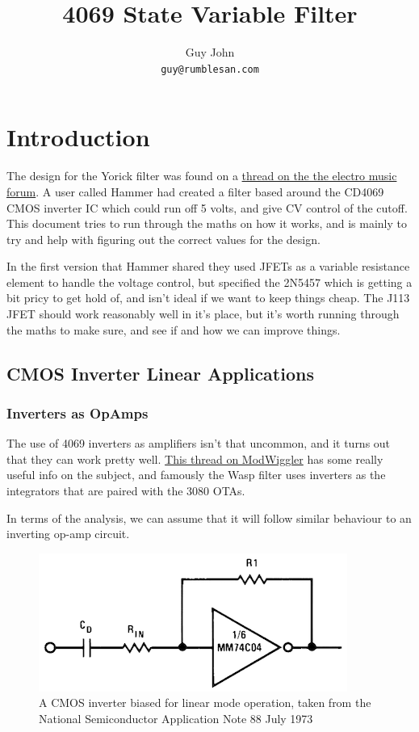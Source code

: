 \documentclass{article}
\title{4069 State Variable Filter}
\author{Guy John \\ \texttt{guy@rumblesan.com}}
\begin{document}
\maketitle

\section{Introduction}
The design for the Yorick filter was found on a \href{https://electro-music.com/forum/topic-69887.html}{thread on the the electro music forum}. A user called Hammer had created a filter based around the CD4069 CMOS inverter IC which could run off 5 volts, and give CV control of the cutoff. This document tries to run through the maths on how it works, and is mainly to try and help with figuring out the correct values for the design.

In the first version that Hammer shared they used JFETs as a variable resistance element to handle the voltage control, but specified the 2N5457 which is getting a bit pricy to get hold of, and isn't ideal if we want to keep things cheap. The J113 JFET should work reasonably well in it's place, but it's worth running through the maths to make sure, and see if and how we can improve things.

\newpage

\subsection{CMOS Inverter Linear Applications}

\subsubsection{Inverters as OpAmps}

The use of 4069 inverters as amplifiers isn't that uncommon, and it turns out that they can work pretty well. \href{https://www.modwiggler.com/forum/viewtopic.php?t=256633&hilit=4069+amplifier}{This thread on ModWiggler} has some really useful info on the subject, and famously the Wasp filter uses inverters as the integrators that are paired with the 3080 OTAs.

In terms of the analysis, we can assume that it will follow similar behaviour to an inverting op-amp circuit.

\begin{figure}[h]
  \caption{A CMOS inverter biased for linear mode operation, taken from the National Semiconductor Application Note 88 July 1973}
  \centering
  \includegraphics[width=\linewidth]{images/inverter-feedback-amplifier.png}
\end{figure}
\end{document}
